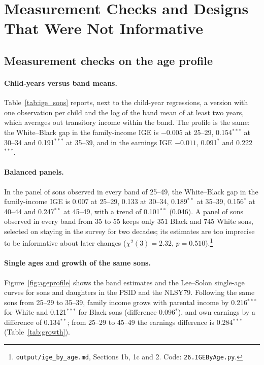 \section{Measurement Checks and Designs That Were Not Informative}\label{app:checks}

\subsection{Measurement checks on the age profile}

\paragraph{Child-years versus band means.} Table~\ref{tab:ige_sons} reports, next to the child-year regressions, a
version with one observation per child and the log of the band mean of at least two years, which averages out
transitory income within the band. The profile is the same: the White--Black gap in the family-income IGE is
$-0.005$ at 25--29, 0.154$^{***}$ at 30--34 and 0.191$^{***}$ at 35--39, and in the earnings IGE $-0.011$, 0.091$^{*}$
and 0.222$^{***}$.

\paragraph{Balanced panels.} In the panel of sons observed in every band of 25--49, the White--Black gap in the
family-income IGE is 0.007 at 25--29, 0.133 at 30--34, 0.189$^{**}$ at 35--39, 0.156$^{*}$ at 40--44 and 0.247$^{**}$
at 45--49, with a trend of 0.101$^{**}$ (0.046). A panel of sons observed in every band from 35 to 55 keeps only 351
Black and 745 White sons, selected on staying in the survey for two decades; its estimates are too imprecise to be
informative about later changes ($\chi^2(3)=2.32$, $p=0.510$).\footnote{\texttt{output/ige\_by\_age.md}, Sections 1b,
1c and 2. Code: \texttt{26.IGEByAge.py}.}

\paragraph{Single ages and growth of the same sons.} Figure~\ref{fig:ageprofile} shows the band estimates and the
Lee--Solon single-age curves for sons and daughters in the PSID and the NLSY79. Following the same sons from 25--29 to
35--39, family income grows with parental income by 0.216$^{***}$ for White and 0.121$^{***}$ for Black sons
(difference 0.096$^{*}$), and own earnings by a difference of 0.134$^{**}$; from 25--29 to 45--49 the earnings
difference is 0.284$^{***}$ (Table~\ref{tab:growth}).

